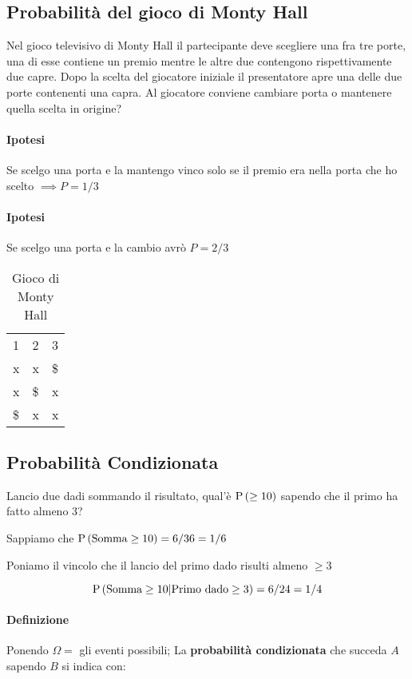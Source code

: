 \subsection{Probabilità del gioco di Monty Hall}
Nel gioco televisivo di Monty Hall il partecipante deve scegliere una fra tre porte, una di esse contiene un premio mentre le altre due contengono rispettivamente due capre. Dopo la scelta del giocatore iniziale il presentatore apre una delle due porte contenenti una capra. Al giocatore conviene cambiare porta o mantenere quella scelta in origine?

\paragraph{Ipotesi} Se scelgo una porta e la mantengo vinco solo se il premio era nella porta che ho scelto $ \implies P = 1/3 $

\paragraph{Ipotesi} Se scelgo una porta e la cambio avrò $ P = 2/3 $

\clearpage


\begin{table}[]
	\caption{Gioco di Monty Hall}
	\begin{tabular}{lll}
		1  & 2  & 3  \\
		x  & x  & \$ \\
		x  & \$ & x  \\
		\$ & x  & x 
	\end{tabular}
\end{table}


\subsection{Probabilità Condizionata}
Lancio due dadi sommando il risultato, qual'è $ \text{P}\left(\geq 10\right) $ sapendo che il primo ha fatto almeno 3?

Sappiamo che $ \text{P}\left(\text{Somma} \geq 10\right) = 6/36 = 1/6 $

Poniamo il vincolo che il lancio del primo dado risulti almeno $ \geq 3 $

\[ \text{P}\left(\text{Somma} \geq 10 | \text{Primo dado} \geq 3\right) = 6/24 = 1/4\]

\paragraph{Definizione}
Ponendo $ \Omega = $ gli eventi possibili;
La \textbf{probabilità condizionata} che succeda $ A $ sapendo $ B $ si indica con:

